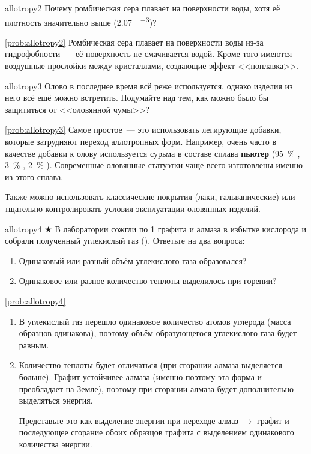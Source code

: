\begin{problem}{}{allotropy2}
    Почему ромбическая сера плавает на поверхности воды, хотя её плотность значительно выше (\qty{2,07}{\ruG\per\ruCm\cubed})?
    \begin{sol}{\ref{prob:allotropy2}}
        Ромбическая сера плавает на поверхности воды из\nobreakdash-за гидрофобности~--- её поверхность не смачивается водой. Кроме того имеются воздушные прослойки между кристаллами, создающие эффект <<поплавка>>.
    \end{sol}
\end{problem}

\begin{problem}{}{allotropy3}
    Олово в последнее время всё реже используется, однако изделия из него всё ещё можно встретить. Подумайте над тем, как можно было бы защититься от <<оловянной чумы>>?
    \begin{sol}{\ref{prob:allotropy3}}
        Самое простое~--- это использовать легирующие добавки, которые затрудняют переход аллотропных форм. Например, очень часто в качестве добавки к олову используется сурьма в составе сплава \textbf{пьютер} (\qty{95}{\percent} , \qty{3}{\percent} , \qty{2}{\percent} ). Современные оловянные статуэтки чаще всего изготовлены именно из этого сплава.

        Также можно использовать классические покрытия (лаки, гальванические) или тщательно контролировать условия эксплуатации оловянных изделий.
    \end{sol}
\end{problem}

\begin{problem}{}{allotropy4}
    $\bigstar$ В лаборатории сожгли по \qty{1}{\ruG} графита и алмаза в избытке кислорода и собрали полученный углекислый газ (). Ответьте на два вопроса:
    \begin{enumerate}[label=\arabic*)]
        \item Одинаковый или разный объём углекислого газа образовался?
        \item Одинаковое или разное количество теплоты выделилось при горении?
    \end{enumerate}
    \begin{sol}{\ref{prob:allotropy4}}
        \begin{enumerate}[label=\arabic*)]
            \item В углекислый газ перешло одинаковое количество атомов углерода (масса образцов одинакова), поэтому объём образующегося углекислого газа будет равным.
            \item Количество теплоты будет отличаться (при сгорании алмаза выделяется больше). Графит устойчивее алмаза (именно поэтому эта форма и преобладает на Земле), поэтому при сгорании алмаза будет дополнительно выделяться энергия.

            Представьте это как выделение энергии при переходе алмаз $\to$ графит и последующее сгорание обоих образцов графита с выделением одинакового количества энергии.
        \end{enumerate}
    \end{sol}
\end{problem}

